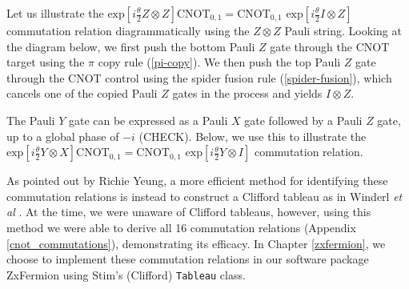 Let us illustrate the $\text{exp} \left[ i\frac{\theta}{2} Z \otimes Z \right] \text{CNOT}_{0, 1} = \text{CNOT}_{0, 1} \,\, \text{exp} \left[ i\frac{\theta}{2} I \otimes Z \right]$ commutation relation diagrammatically using the $Z \otimes Z$ Pauli string. Looking at the diagram below, we first push the bottom Pauli $Z$ gate through the CNOT target using the $\pi$ copy rule (\ref{pi-copy}). We then push the top Pauli $Z$ gate through the CNOT control using the spider fusion rule (\ref{spider-fusion}), which cancels one of the copied Pauli $Z$ gates in the process and yields $I \otimes Z$.


The Pauli $Y$ gate can be expressed as a Pauli $X$ gate followed by a Pauli $Z$ gate, up to a global phase of $-i$ (CHECK). Below, we use this to illustrate the $\text{exp} \left[ i\frac{\theta}{2} Y \otimes X \right] \text{CNOT}_{0, 1} = \text{CNOT}_{0, 1} \,\, \text{exp} \left[ i\frac{\theta}{2} Y \otimes I \right]$ commutation relation.



As pointed out by Richie Yeung, a more efficient method for identifying these commutation relations is instead to construct a Clifford tableau as in Winderl \textit{et al} \cite{Yeung2023}. At the time, we were unaware of Clifford tableaus, however, using this method we were able to derive all 16 commutation relations (Appendix \ref{cnot_commutations}), demonstrating its efficacy. In Chapter \ref{zxfermion}, we choose to implement these commutation relations in our software package ZxFermion using Stim's (Clifford) \lstinline{Tableau} class.
